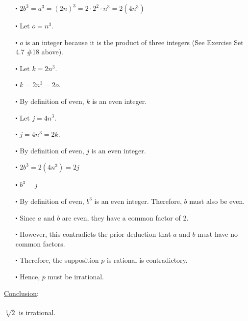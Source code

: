 \documentclass[12pt]{article}
\begin{document}
\begin{itemize}
  \item [$\centerdot$] $2b^3 = a^3 = (2n)^3 = 2\cdot2^2\cdot n^3 = 2(4n^3)$ 
  \item [$\centerdot$] Let $o = n^3$.
  \item [$\centerdot$] $o$ is an integer because it is the product of three integers (See Exercise Set 4.7 \#18  above).
  \item [$\centerdot$] Let $k = 2n^3$.
  \item [$\centerdot$] $k = 2n^3 = 2o$.
  \item [$\centerdot$] By definition of even, $k$ is an even integer.
  \item [$\centerdot$] Let $j = 4n^3$.
  \item [$\centerdot$] $j = 4n^3 = 2k$.
  \item [$\centerdot$] By definition of even, $j$ is an even integer.
  \item [$\centerdot$] $2b^3 = 2(4n^3) = 2j$ 
  \item [$\centerdot$] $b^3 = j$
  \item [$\centerdot$] By definition of even, $b^3$ is an even integer. Therefore, $b$ must also be even.
  \item [$\centerdot$] Since $a$ and $b$ are even, they have a common factor of 2.
  \item [$\centerdot$] However, this contradicts the prior deduction that $a$ and $b$ must have no common factors.
  \item [$\centerdot$] Therefore, the supposition $p$ is rational is contradictory.
  \item [$\centerdot$] Hence, $p$ must be irrational.

\end{itemize}
\underline{Conclusion}:
\\ \\
$\sqrt[3]{2}$ is irrational.
\end{document}
